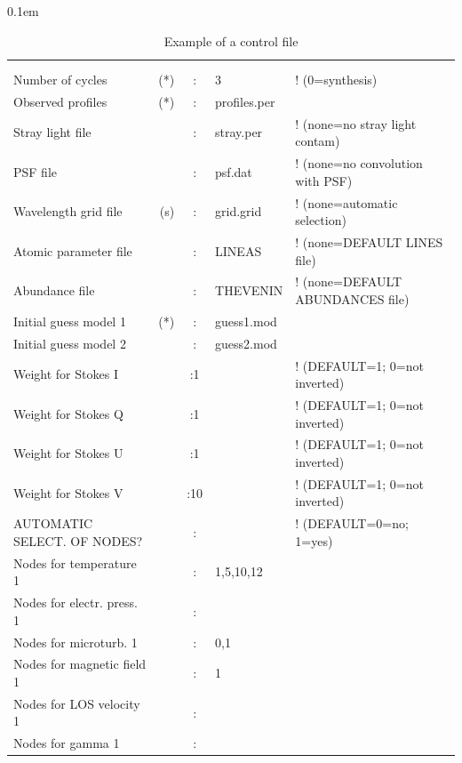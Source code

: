 \documentclass[11pt]{report}
\begin{document}
\begin{table}
\small
\tabcolsep 0.1em
\caption{Example of a control file \protect \\ 
         }
\label{control}
\begin{tabular}{lrcll}
 &  & &            &       \\
 &  & &            &       \\

Number of cycles          &(*)&:&3             &! (0=synthesis)  \\
Observed profiles         &(*)&:&profiles.per &             \\
Stray light file          &   &:&stray.per    & ! (none=no stray light contam)\\
PSF file                  &   &:&psf.dat      & ! (none=no convolution with PSF)\\
Wavelength grid file      &(s)&:&grid.grid     & ! (none=automatic selection)\\
Atomic parameter file      &  &:&LINEAS       & ! (none=DEFAULT LINES file)\\
Abundance file           &   &:&THEVENIN  \phantom{ho}   & ! (none=DEFAULT ABUNDANCES file)\\
Initial guess model 1     &(*)&:&guess1.mod   &\\
Initial guess model 2     &   &:&guess2.mod   &\\
Weight for Stokes I        &  &:1 &            &! (DEFAULT=1; 0=not inverted)\\
Weight for Stokes Q        &  &:1 &            &! (DEFAULT=1; 0=not inverted)\\
Weight for Stokes U        &  &:1 &            &! (DEFAULT=1; 0=not inverted)\\
Weight for Stokes V        &  &:10 &            &! (DEFAULT=1; 0=not inverted)\\
AUTOMATIC SELECT. OF NODES?&  &: &            &! (DEFAULT=0=no; 1=yes)\\
Nodes for temperature 1    &  &:&1,5,10,12       &        \\
Nodes for electr. press. 1 &  &:&             &        \\
Nodes for microturb. 1     &  &:&0,1            &       \\
Nodes for magnetic field 1 &  &:&1		   &\\
Nodes for LOS velocity 1   &  &:&     &         \\
Nodes for gamma 1          &  &:&     &          \\

\end{tabular}
\end{table}
\end{document}
